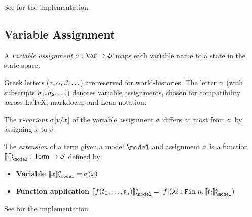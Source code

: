 \documentclass[../LogosReference.tex]{subfiles}
\begin{document}
\noindent
See  for the implementation.


\subsection{Variable Assignment}\label{sec:variable-assignment}

\begin{definition}\label{def:variable-assignment}
	A \emph{variable assignment} $\sigma : \mathrm{Var} \to \mathcal{S}$ maps each variable name to a state in the state space.
\end{definition}

\begin{notation}
	Greek letters ($\tau, \alpha, \beta, \ldots$) are reserved for world-histories.
	The letter $\sigma$ (with subscripts $\sigma_1, \sigma_2, \ldots$) denotes variable assignments, chosen for compatibility across \LaTeX, markdown, and Lean notation.
\end{notation}


\begin{definition}\label{def:variant-assignment}
	The \textit{$x$-variant} $\sigma[v/x]$ of the variable assignment $\sigma$ differs at most from $\sigma$ by assigning $x$ to $v$.
\end{definition}

\begin{definition}\label{def:term-extension}
	The \emph{extension} of a term given a model $\model$ and assignment $\sigma$ is a function $\sem{\cdot}^\assignment_\model : \Term \to \statespace$ defined by:
	\begin{itemize}
		\item \textbf{Variable} $\sem{x}^\assignment_\model = \assignment(x)$
		\item \textbf{Function application} $\sem{f(t_1, \ldots, t_n)}^\assignment_\model = \interp{f}(\lambda i : \Fin\;n, \sem{t_i}^\assignment_\model)$
	\end{itemize}
\end{definition}

\noindent
See  for the implementation.
\end{document}
